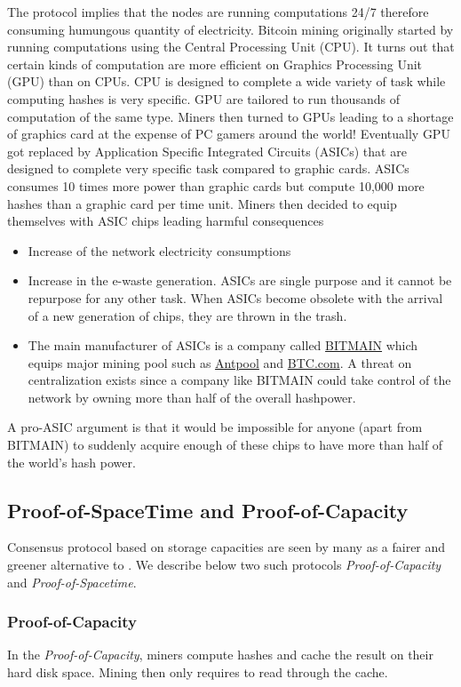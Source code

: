 \noindent The \PoW protocol implies that the nodes are running computations 24/7 therefore consuming humungous quantity of electricity. Bitcoin mining originally started by running computations using the Central Processing Unit (CPU). It turns out that certain kinds of computation are more efficient on Graphics Processing Unit (GPU) than on CPUs. CPU is designed to complete a wide variety of task while computing hashes is very specific. GPU are tailored to run thousands of computation of the same type. Miners then turned to GPUs leading to a shortage of graphics card at the expense of PC gamers around the world! Eventually GPU got replaced by Application Specific Integrated Circuits (ASICs) that are designed to complete very specific task compared to graphic cards. ASICs consumes 10 times more power than graphic cards but compute 10,000 more hashes than a graphic card per time unit. Miners then decided to equip themselves with ASIC chips leading harmful consequences
\begin{itemize}
    \item Increase of the network electricity consumptions
    \item Increase in the e-waste generation. ASICs are single purpose and it cannot be repurpose for any other task. When ASICs become obsolete with the arrival of a new generation of chips, they are thrown in the trash.
    \item The main manufacturer of ASICs is a company called \href{https://www.bitmain.com/}{BITMAIN} which equips major mining pool such as \href{https://v3.antpool.com/home}{Antpool} and \href{https://btc.com}{BTC.com}. A threat on centralization exists since a company like BITMAIN could take control of the network by owning more than half of the overall hashpower.
\end{itemize} 
A pro-ASIC argument is that it would be impossible for anyone (apart from BITMAIN) to suddenly acquire enough of these chips to have more than half of the world's hash power.
\subsection{Proof-of-SpaceTime and Proof-of-Capacity}\label{ssec:posp}
Consensus protocol based on storage capacities are seen by many as a fairer and greener alternative to \PoW. We describe below two such protocols \textit{Proof-of-Capacity} and \textit{Proof-of-Spacetime}.
\subsubsection{Proof-of-Capacity}
In the \textit{Proof-of-Capacity}, miners compute hashes and cache the result on their hard disk space. Mining then only requires to read through the cache. 
